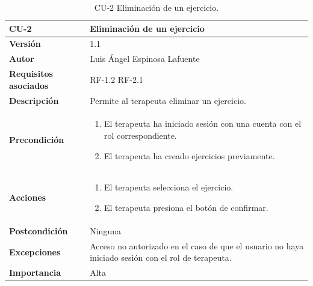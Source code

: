 \begin{table}[p]
	\centering
	\begin{tabularx}{\linewidth}{ p{} p{} }
		\toprule
		\textbf{CU-2}    & \textbf{Eliminación de un ejercicio}\\
		\toprule
		\textbf{Versión}              & 1.1    \\
		\textbf{Autor}                & Luis Ángel Espinosa Lafuente\\
		\textbf{Requisitos asociados} & RF-1.2 RF-2.1 \\
		\textbf{Descripción}          & Permite al terapeuta eliminar un ejercicio.   \\
		\textbf{Precondición}         & 
		\begin{enumerate}		
			\def\labelenumi{\arabic{enumi}.}
			\tightlist
				\item El terapeuta ha iniciado sesión con una cuenta con el rol correspondiente.
				\item El terapeuta ha creado ejercicios previamente. 
		\end{enumerate} \\
		\textbf{Acciones}             &
		\begin{enumerate}
			\def\labelenumi{\arabic{enumi}.}
			\tightlist
			\item El terapeuta selecciona el ejercicio.
			\item El terapeuta presiona el botón de confirmar.
		\end{enumerate}\\
		\textbf{Postcondición}        & Ninguna \\
		\textbf{Excepciones}          & Acceso no autorizado en el caso de que el usuario no haya iniciado sesión con el rol de terapeuta. \\
		\textbf{Importancia}          & Alta \\
		\bottomrule
	\end{tabularx}
	\caption{CU-2 Eliminación de un ejercicio.}
\end{table}

